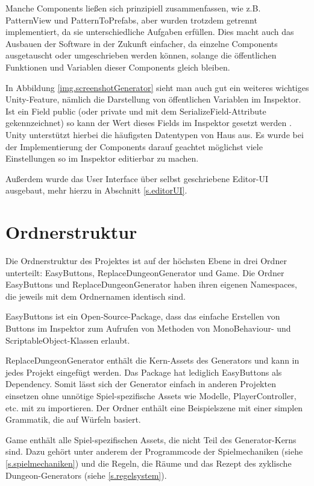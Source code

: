 Manche Components ließen sich prinzipiell zusammenfassen, wie z.B. PatternView und PatternToPrefabs, aber wurden trotzdem getrennt implementiert, da sie unterschiedliche Aufgaben erfüllen. Dies macht auch das Ausbauen der Software in der Zukunft einfacher, da einzelne Components ausgetauscht oder umgeschrieben werden können, solange die öffentlichen Funktionen und Variablen dieser Components gleich bleiben.

In Abbildung \ref{img.screenshotGenerator} sieht man auch gut ein weiteres wichtiges Unity-Feature, nämlich die Darstellung von öffentlichen Variablen im Inspektor. Ist ein Field public (oder private und mit dem SerializeField-Attribute gekennzeichnet) so kann der Wert dieses Fields im Inspektor gesetzt werden \cite[Seite: VariablesAndTheInspector]{unityManual} \cite[Seite: SerializeField]{unitySciptingReference}. Unity unterstützt hierbei die häufigsten Datentypen von Haus aus. Es wurde bei der Implementierung der Components darauf geachtet möglichst viele Einstellungen so im Inspektor editierbar zu machen.

Außerdem wurde das User Interface über selbst geschriebene Editor-UI ausgebaut, mehr hierzu in Abschnitt \ref{s.editorUI}.

\section{Ordnerstruktur}

Die Ordnerstruktur des Projektes ist auf der höchsten Ebene in drei Ordner unterteilt: EasyButtons, ReplaceDungeonGenerator und Game. Die Ordner EasyButtons und ReplaceDungeonGenerator haben ihren eigenen Namespaces, die jeweils mit dem Ordnernamen identisch sind.

EasyButtons ist ein Open-Source-Package, dass das einfache Erstellen von Buttons im Inspektor zum Aufrufen von Methoden von MonoBehaviour- und ScriptableObject-Klassen erlaubt. \cite{easyButtons}

ReplaceDungeonGenerator enthält die Kern-Assets des Generators und kann in jedes Projekt eingefügt werden. Das Package hat lediglich EasyButtons als Dependency. Somit lässt sich der Generator einfach in anderen Projekten einsetzen ohne unnötige Spiel-spezifische Assets wie Modelle, PlayerController, etc. mit zu importieren. Der Ordner enthält eine Beispielszene mit einer simplen Grammatik, die auf Würfeln basiert.

Game enthält alle Spiel-spezifischen Assets, die nicht Teil des Generator-Kerns sind. Dazu gehört unter anderem der Programmcode der Spielmechaniken (siehe \ref{s.spielmechaniken}) und die Regeln, die Räume und das Rezept des zyklische Dungeon-Generators (siehe \ref{s.regelsystem}).

